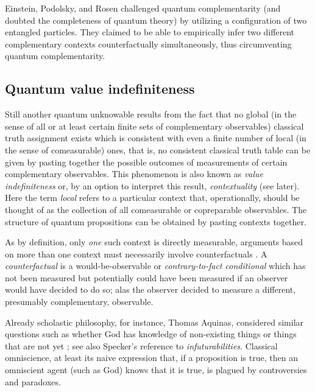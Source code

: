 \documentclass[%
 reprint,
 showpacs,
 showkeys,
 preprintnumbers,
 amsmath,amssymb,
 aps,
 prl,
  longbibliography,
 ]{revtex4-1}
\begin{document}
Einstein, Podolsky, and Rosen \citeyearpar{epr} challenged quantum complementarity (and doubted the completeness of quantum theory)
by utilizing a configuration
of two entangled \citep{schrodinger,CambridgeJournals:1737068,CambridgeJournals:2027212} particles.
They
claimed to be able to empirically infer two different complementary contexts counterfactually simultaneously,
thus circumventing quantum complementarity.

\subsection{Quantum value indefiniteness}

Still another quantum unknowable results from the fact that no global
(in the sense of all or at least certain finite sets of  complementary observables)
classical truth
assignment exists which is consistent with even a finite number of local (in the sense of comeasurable) ones,
that is, no consistent classical truth table can be given by pasting together the possible outcomes of measurements of certain complementary observables.
This phenomenon is also known as {\em value indefiniteness} or, by an option to interpret this result, {\em contextuality}  (see later).
Here the term {\em local} refers to a particular context \citep{svozil-2008-ql}
that, operationally, should be thought of as the collection of all comeasurable or copreparable \citep{zeil-99} observables.
The structure of quantum propositions \citep{birkhoff-36,kochen3,kalmbach-83,kalmbach-86,pulmannova-91,nav:91,svozil-ql}
can be obtained by pasting contexts together.

As by definition, only {\em one} such context is directly measurable,
arguments based on more than one context must necessarily involve counterfactuals \citep{svozil-2006-omni,vaidman:2009}.
A {\em counterfactual} is a would-be-observable or
{\em contrary-to-fact conditional}
\citep{chisholm-46}
which has not been measured but potentially could have been measured
if an observer would have decided to do so; alas the observer decided to measure a different, presumably complementary, observable.

Already scholastic philosophy,
for instance, Thomas Aquinas,
considered similar questions such as whether God has knowledge of
non-existing  things \cite[part one, question 14, article 9]{Aquinas} or things
that are not yet \cite[part one, question 14, article 13]{Aquinas};
see also Specker's \citeyearpar[243]{specker-60}  reference to {\it infuturabilities}.
Classical omniscience, at least its naive expression that,
if a proposition is true, then an omniscient agent (such as God) knows that it is true,
is plagued by controversies and paradoxes.
\end{document}
